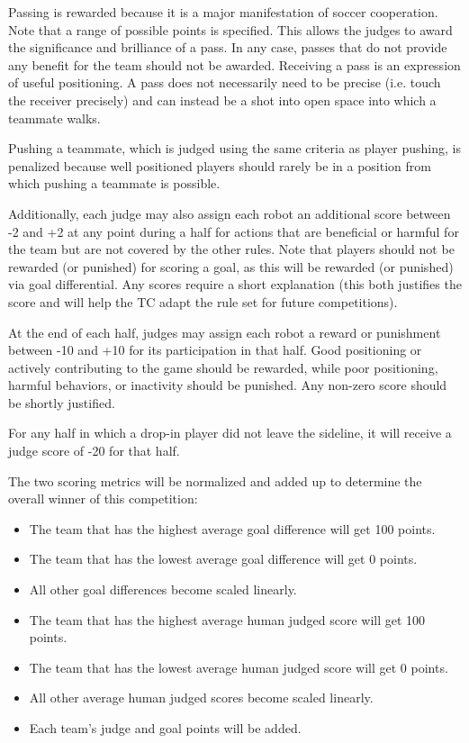 \documentclass[12pt]{article}
\begin{document}
Passing is rewarded because it is a major manifestation of soccer cooperation. Note that a range of possible points is specified. This allows the judges to award the significance and brilliance of a pass. In any case, passes that do not provide any benefit for the team should not be awarded. Receiving a pass is an expression of useful positioning. A pass does not necessarily need to be precise (i.e. touch the receiver precisely) and can instead be a shot into open space into which a teammate walks.

Pushing a teammate, which is judged using the same criteria as player pushing, is penalized because well positioned players should rarely be in a position from which pushing a teammate is possible.

Additionally, each judge may also assign each robot an additional score between -2 and +2 at any point during a half for actions that are beneficial or harmful for the team but are not covered by the other rules.  Note that players should not be rewarded (or punished) for scoring a goal, as this will be rewarded (or punished) via goal differential.  Any scores require a short explanation (this both justifies the score and will help the TC adapt the rule set for future competitions).

At the end of each half, judges may assign each robot a reward or punishment between -10 and +10 for its participation in that half.  Good positioning or actively contributing to the game should be rewarded, while poor positioning, harmful behaviors, or inactivity should be punished. Any non-zero score should be shortly justified.

For any half in which a drop-in player did not leave the sideline, it will receive a judge score of -20 for that half.

The two scoring metrics will be normalized and added up to determine the overall winner of this competition:
\begin{itemize}
\item The team that has the highest average goal difference will get 100 points.
\item The team that has the lowest average goal difference will get 0 points.
\item All other goal differences become scaled linearly. 
\item The team that has the highest average human judged score will get 100 points.
\item The team that has the lowest average human judged score will get 0 points.
\item All other average human judged scores become scaled linearly. 
\item Each team's judge and goal points will be added.
\end{itemize}
\end{document}
